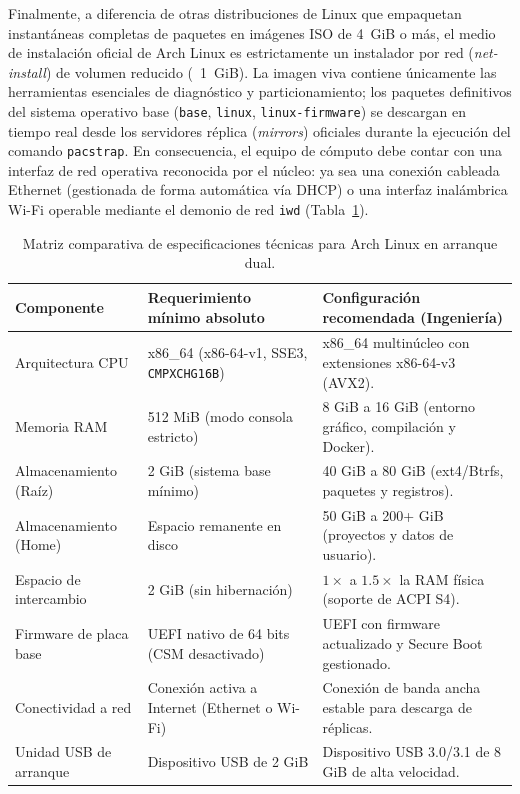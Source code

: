 \documentclass[12pt]{article}
\begin{document}
Finalmente, a diferencia de otras distribuciones de Linux que empaquetan instantáneas completas de paquetes en imágenes ISO de 4~GiB o más, el medio de instalación oficial de Arch Linux es estrictamente un instalador por red (\textit{net-install}) de volumen reducido (~1~GiB). La imagen viva contiene únicamente las herramientas esenciales de diagnóstico y particionamiento; los paquetes definitivos del sistema operativo base (\texttt{base}, \texttt{linux}, \texttt{linux-firmware}) se descargan en tiempo real desde los servidores réplica (\textit{mirrors}) oficiales durante la ejecución del comando \texttt{pacstrap}. En consecuencia, el equipo de cómputo debe contar con una interfaz de red operativa reconocida por el núcleo: ya sea una conexión cableada Ethernet (gestionada de forma automática vía DHCP) o una interfaz inalámbrica Wi-Fi operable mediante el demonio de red \texttt{iwd} (Tabla~\ref{tab:especificacionesHardware}).

\begin{table}[H]
\centering
\small
\caption{Matriz comparativa de especificaciones técnicas para Arch Linux en arranque dual.}
\label{tab:especificacionesHardware}
\begin{tabularx}{\textwidth}{@{} l p{5.5cm} X @{}}
\toprule
\textbf{Componente} & \textbf{Requerimiento mínimo absoluto} & \textbf{Configuración recomendada (Ingeniería)} \\
\midrule
Arquitectura CPU & x86\_64 (x86-64-v1, SSE3, \texttt{CMPXCHG16B}) & x86\_64 multinúcleo con extensiones x86-64-v3 (AVX2). \\
Memoria RAM & 512 MiB (modo consola estricto) & 8 GiB a 16 GiB (entorno gráfico, compilación y Docker). \\
Almacenamiento (Raíz) & 2 GiB (sistema base mínimo) & 40 GiB a 80 GiB (ext4/Btrfs, paquetes y registros). \\
Almacenamiento (Home) & Espacio remanente en disco & 50 GiB a 200+ GiB (proyectos y datos de usuario). \\
Espacio de intercambio & 2 GiB (sin hibernación) & $1\times$ a $1.5\times$ la RAM física (soporte de ACPI S4). \\
Firmware de placa base & UEFI nativo de 64 bits (CSM desactivado) & UEFI con firmware actualizado y Secure Boot gestionado. \\
Conectividad a red & Conexión activa a Internet (Ethernet o Wi-Fi) & Conexión de banda ancha estable para descarga de réplicas. \\
Unidad USB de arranque & Dispositivo USB de 2 GiB & Dispositivo USB 3.0/3.1 de 8 GiB de alta velocidad. \\
\bottomrule
\end{tabularx}
\end{table}
\end{document}
